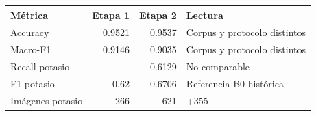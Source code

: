 \begin{tabular}{lrrl}
\toprule
\textbf{Métrica} & \textbf{Etapa 1} & \textbf{Etapa 2} & \textbf{Lectura} \\
\midrule
Accuracy & 0.9521 & 0.9537 & Corpus y protocolo distintos \\
Macro-F1 & 0.9146 & 0.9035 & Corpus y protocolo distintos \\
Recall potasio & -- & 0.6129 & No comparable \\
F1 potasio & 0.62 & 0.6706 & Referencia B0 histórica \\
Imágenes potasio & 266 & 621 & +355 \\
\bottomrule
\end{tabular}
